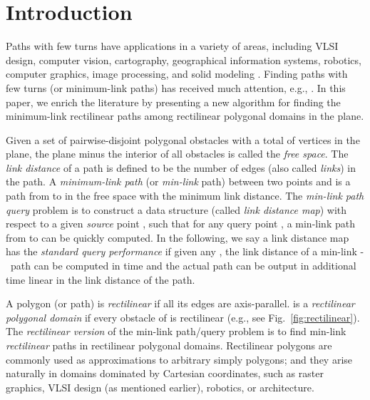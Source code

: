 \documentclass[english,runningheads,11pt]{llncs-revised}
\def\st{-}
\begin{document}
\section{Introduction}
\label{sec:intro}

Paths with few turns have applications in a variety of areas,
including VLSI design, computer vision,
cartography, geographical information systems, robotics, computer
graphics, image processing, and solid modeling
\cite{ref:ArkinLo95,ref:DjidjevAn92,ref:GuibasAp93,ref:KolarovOn91,ref:McMasterAu87,ref:NatarajanOn91,ref:ReifMi87,ref:SuriMi87,ref:TamassiaOn86}.
Finding paths with few turns (or
minimum-link paths) has received much attention, e.g.,
\cite{ref:AdegeestMi94,ref:ArkinLo95,ref:DasGe91,ref:deBergOn91,ref:deRezendeRe89,ref:ElGindyHi85,ref:GhoshCo91,ref:ImaiEf86,ref:LingasOp95,ref:MaheshwariLi00,ref:MitchellMi14,ref:MitchellMi92,ref:ReifMi87,ref:SchuiererAn96,ref:SuriA86,ref:SuriMi87,ref:SuriOn90}.
In this paper, we enrich the literature by presenting a new algorithm for
finding the minimum-link rectilinear paths among rectilinear polygonal
domains in the plane.


Given a set  of  pairwise-disjoint polygonal obstacles with
a total of  vertices in the plane,
the plane minus the interior of all obstacles is called the {\em free space}.
The {\em link distance} of a
path is defined to be the number of edges (also called {\em links})
in the path. A {\em minimum-link path} (or {\em min-link} path)
between two points  and  is a path from  to  in the free space
with the minimum link distance.
The {\em min-link path query} problem is to construct a data structure (called
{\em link distance map}) with respect to a given {\em source} point
, such that for any query point , a min-link path from 
to  can be quickly computed. In the following, we say a
link distance map has the {\em standard query performance} if given any
, the link distance of a min-link \st\ path can be computed in
 time and the actual path can be output in additional time
linear in the link distance of the path.

A polygon (or path) is {\em rectilinear} if all its edges are
axis-parallel.   is a {\em rectilinear
polygonal domain} if every obstacle of  is rectilinear
(e.g., see Fig.~\ref{fig:rectilinear}).
The {\em rectilinear version} of the min-link path/query problem is to
find min-link {\em rectilinear} paths in rectilinear polygonal domains.
Rectilinear polygons are commonly used as
approximations to arbitrary simply polygons; and they arise naturally
in domains dominated by Cartesian coordinates, such as raster
graphics, VLSI design (as mentioned earlier), robotics, or architecture.
\end{document}
